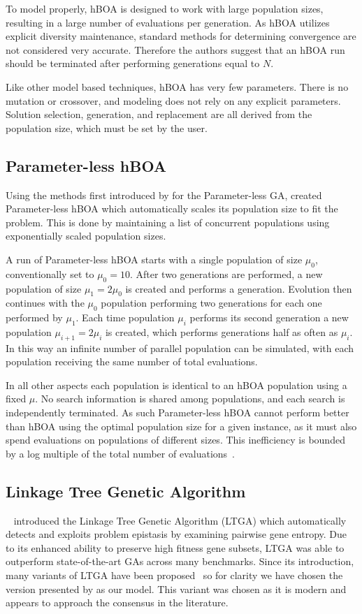 \documentclass[twoside]{article}
\begin{document}
To model properly, hBOA is designed to work with large population sizes, resulting in a large number of
evaluations per generation. As hBOA utilizes explicit diversity maintenance, standard methods for determining
convergence are not considered very accurate. Therefore the authors suggest that an hBOA run should be
terminated after performing generations equal to $N$.

Like other model based techniques, hBOA has very few parameters. There is no mutation or crossover,
and modeling does not rely on any explicit parameters. Solution selection, generation, and replacement
are all derived from the population size, which must be set by the user.

\subsection{Parameter-less hBOA}
Using the methods first introduced by \cite{harik:1999:parameterlessga} for the Parameter-less GA,
\cite{pelikan:2004:parameterlesshboa} created Parameter-less hBOA which automatically scales its
population size to fit the problem. This is done by maintaining a list of concurrent populations
using exponentially scaled population sizes.

A run of Parameter-less hBOA starts with a single population of size $\mu_0$, conventionally set
to $\mu_0=10$. After two generations are performed, a new population of size $\mu_1 = 2\mu_0$ is created
and performs a generation. Evolution then continues with the $\mu_0$ population performing two generations
for each one performed by $\mu_1$. Each time population $\mu_i$ performs its second generation a new population
$\mu_{i+1}=2\mu_i$ is created, which performs generations half as often as $\mu_i$. In this way an infinite number of
parallel population can be simulated, with each population receiving the same number of total evaluations.

In all other aspects each population is identical to an hBOA population using a fixed $\mu$. No search information
is shared among populations, and each search is independently terminated. As such Parameter-less hBOA cannot
perform better than hBOA using the optimal population size for a given instance, as it must also spend evaluations
on populations of different sizes. This inefficiency is bounded by a log multiple of the total number of
evaluations~\citep{pelikan:1999:worstparameter-less}.

\subsection{Linkage Tree Genetic Algorithm}
~\cite{thierens:2010:ltga} introduced the Linkage Tree Genetic Algorithm (LTGA) which automatically
detects and exploits problem epistasis by examining pairwise gene entropy. Due to its enhanced
ability to preserve high fitness gene subsets, LTGA was able to outperform state-of-the-art
GAs across many benchmarks. Since its introduction, many variants of LTGA have been
proposed~\citep{goldman:2012:ltga} so for clarity we have chosen the version
presented by \cite{thierens:2013:ltgahiff} as our model. This variant was chosen as it is
modern and appears to approach the consensus in the literature.
\end{document}
